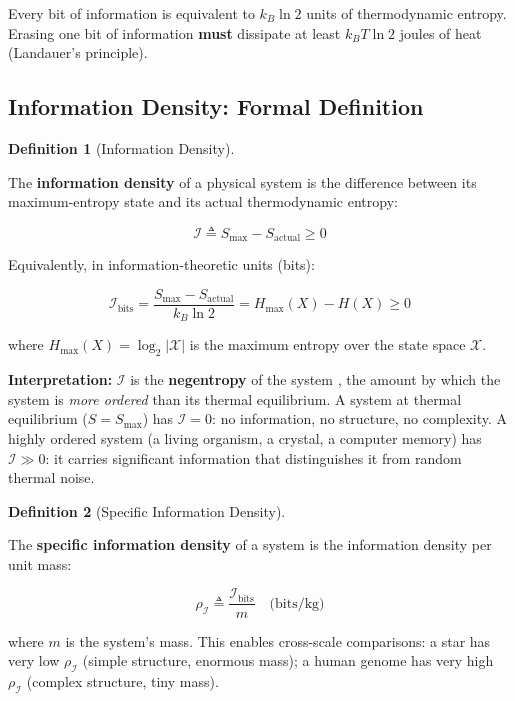 \documentclass[11pt]{article}
\theoremstyle{plain}
\theoremstyle{definition}
\newtheorem{definition}{Definition}
\theoremstyle{remark}
\let\origsubsection\subsection
\renewcommand{\subsection}{\needspace{7\baselineskip}\origsubsection}
\begin{document}
Every bit of information is equivalent to \(k_B \ln 2\) units of
thermodynamic entropy. Erasing one bit of information \textbf{must}
dissipate at least \(k_B T \ln 2\) joules of heat (Landauer's
principle).

\subsection{Information Density: Formal
Definition}\label{information-density-formal-definition}

\begin{definition}[Information Density]
\label{def-information-density}

The \textbf{information density} of a physical system is the difference between its maximum-entropy state and its actual thermodynamic entropy:

$$\mathcal{I} \triangleq S_{\max} - S_{\text{actual}} \geq 0$$

Equivalently, in information-theoretic units (bits):

$$\mathcal{I}_{\text{bits}} = \frac{S_{\max} - S_{\text{actual}}}{k_B \ln 2} = H_{\max}(X) - H(X) \geq 0$$

where $H_{\max}(X) = \log_2 |\mathcal{X}|$ is the maximum entropy over the state space $\mathcal{X}$.
\end{definition}

\textbf{Interpretation:} \(\mathcal{I}\) is the \textbf{negentropy} of
the system \citep{Brillouin1962}, the amount by which the system is
\emph{more ordered} than its thermal equilibrium. A system at thermal
equilibrium (\(S = S_{\max}\)) has \(\mathcal{I} = 0\): no information,
no structure, no complexity. A highly ordered system (a living organism,
a crystal, a computer memory) has \(\mathcal{I} \gg 0\): it carries
significant information that distinguishes it from random thermal noise.

\begin{definition}[Specific Information Density]
\label{def-specific-information-density}

The \textbf{specific information density} of a system is the information density per unit mass:

$$\rho_{\mathcal{I}} \triangleq \frac{\mathcal{I}_{\text{bits}}}{m} \quad \text{(bits/kg)}$$

where $m$ is the system's mass. This enables cross-scale comparisons: a star has very low $\rho_{\mathcal{I}}$ (simple structure, enormous mass); a human genome has very high $\rho_{\mathcal{I}}$ (complex structure, tiny mass).
\end{definition}
\end{document}
